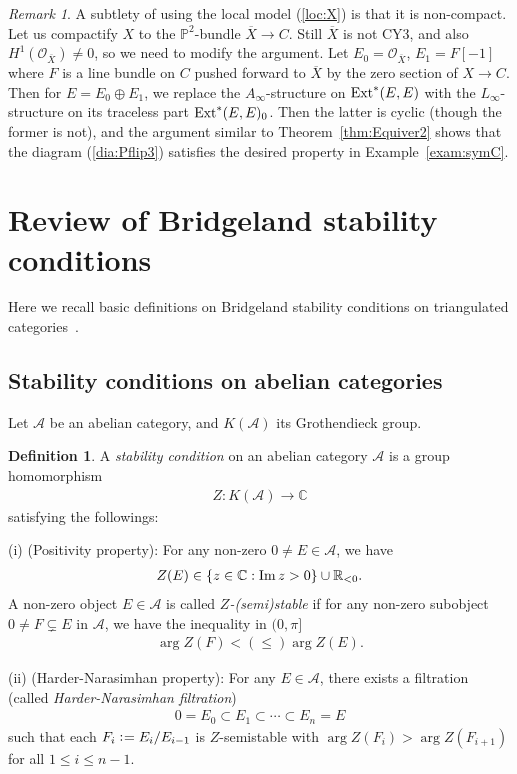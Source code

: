 \documentclass[11pt]{amsart}
\theoremstyle{plain}
\theoremstyle{definition}
\newtheorem{defi}[thm]{Definition}
\theoremstyle{remark}
\newtheorem{rmk}[thm]{Remark}
\newcommand{\aA}{\mathcal{A}}
\newcommand{\oO}{\mathcal{O}}
\newcommand{\Ext}{\mathop{\rm Ext}\nolimits}
\newcommand{\Imm}{\mathop{\rm Im}\nolimits}
\begin{document}
\begin{rmk}\label{rmk:sym}
A subtlety of using the local model (\ref{loc:X})
is that it is non-compact. 
Let us compactify $X$ to 
the $\mathbb{P}^2$-bundle $\overline{X} \to C$. 
Still $\overline{X}$ is not CY3, and 
also $H^1(\oO_{\overline{X}}) \neq 0$, 
so we need to modify the argument. 
Let $E_0=\oO_{\overline{X}}$, 
$E_1=F[-1]$ where $F$ is a 
line bundle on $C$ pushed forward to $\overline{X}$
by the zero section of $X \to C$. 
Then for $E=E_0 \oplus E_1$, 
we replace
the $A_{\infty}$-structure on 
$\Ext^{\ast}(E, E)$
with the $L_{\infty}$-structure 
on its traceless part 
$\Ext^{\ast}(E, E)_0$. 
Then the latter is cyclic (though the former is not), 
and the argument similar to Theorem~\ref{thm:Equiver2}
shows that the diagram (\ref{dia:Pflip3})
satisfies the desired property in Example~\ref{exam:symC}. 
\end{rmk}




\appendix
{}

\section{Review of Bridgeland stability conditions}\label{sec:Bridgeland}
Here we recall basic definitions on Bridgeland stability 
conditions on triangulated categories~\cite{Brs1}. 

\subsection{Stability conditions on abelian categories}
Let $\aA$ be an abelian category, and $K(\aA)$ its 
Grothendieck group. 
\begin{defi}\label{defi:stabA}
A \textit{stability condition} on an abelian 
category $\aA$
is a group homomorphism
\begin{align*}
Z \colon K(\aA) \to \mathbb{C}
\end{align*}
satisfying the followings: 

(i) (Positivity property): For any non-zero $0 \neq E \in \aA$, 
we have 
\begin{align*}
Z(E) \in \{ z \in \mathbb{C} : \Imm z>0\} \cup \mathbb{R}_{<0}.
\end{align*}
A non-zero object $E \in \aA$ 
is called \textit{$Z$-(semi)stable} if for any 
non-zero subobject $0 \neq F \subsetneq E$ in $\aA$, 
we have the inequality in $(0, \pi]$ 
\begin{align*}
\arg Z(F)<(\le) \arg Z(E).
\end{align*}


(ii) (Harder-Narasimhan property): 
For any $E \in \aA$, there exists a filtration 
(called \textit{Harder-Narasimhan filtration})
\begin{align*}
0=E_0 \subset E_1 \subset \cdots \subset E_n=E
\end{align*}
such that 
each $F_i \cneq E_i/E_{i-1}$ is $Z$-semistable
with $\arg Z(F_i)> \arg Z(F_{i+1})$ for all 
$1\le i \le n-1$. 
\end{defi}
\end{document}
